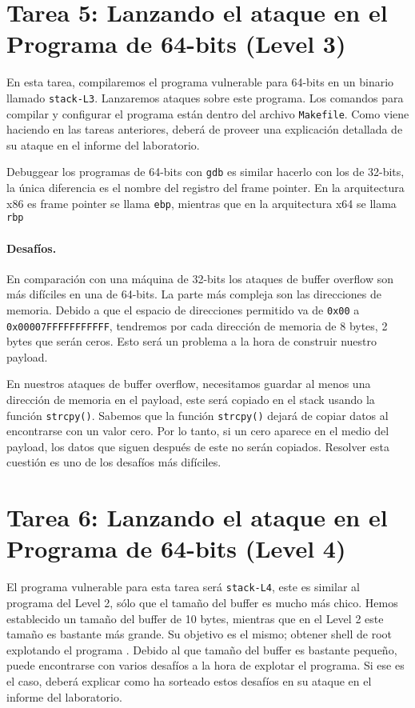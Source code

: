 \section{Tarea 5: Lanzando el ataque en el Programa de 64-bits (Level 3)}

En esta tarea, compilaremos el programa vulnerable para 64-bits en un binario llamado \texttt{stack-L3}. Lanzaremos ataques sobre este programa. Los comandos para compilar y configurar el programa están dentro del archivo \texttt{Makefile}. Como viene haciendo en las tareas anteriores, deberá de proveer una explicación detallada de su ataque en el informe del laboratorio.

Debuggear los programas de 64-bits con \texttt{gdb} es similar hacerlo con los de 32-bits, la única diferencia es el nombre del registro del frame pointer.
En la arquitectura x86 es frame pointer se llama \texttt{ebp}, mientras que en la arquitectura x64 se llama \texttt{rbp}


\paragraph{Desafíos.} En comparación con una máquina de 32-bits los ataques de buffer overflow son más difíciles en una de 64-bits. La parte más compleja son las direcciones de memoria. Debido a que el espacio de direcciones permitido va de \texttt{0x00} a \texttt{0x00007FFFFFFFFFFF}, tendremos por cada dirección de memoria de 8 bytes, 2 bytes que serán ceros.
Esto será un problema a la hora de construir nuestro payload.

En nuestros ataques de buffer overflow, necesitamos guardar al menos una dirección de memoria en el payload, este será copiado en el stack usando la función \texttt{strcpy()}. Sabemos que la función \texttt{strcpy()} dejará de copiar datos al encontrarse con un valor cero. Por lo tanto, si un cero
aparece en el medio del payload, los datos que siguen después de este no serán copiados. Resolver esta cuestión es uno de los desafíos más difíciles.


\section{Tarea 6: Lanzando el ataque en el Programa de 64-bits (Level 4)}

El programa vulnerable para esta tarea será \texttt{stack-L4}, este es similar al programa del Level 2, sólo que el tamaño del buffer es mucho más chico. Hemos establecido un tamaño del buffer de 10 bytes, mientras que en el Level 2 este tamaño es bastante más grande. 
Su objetivo es el mismo; obtener shell de root explotando el programa \setuid.
Debido al que tamaño del buffer es bastante pequeño, puede encontrarse con varios desafíos a la hora de explotar el programa.
Si ese es el caso, deberá explicar como ha sorteado estos desafíos en su ataque en el informe del laboratorio.



